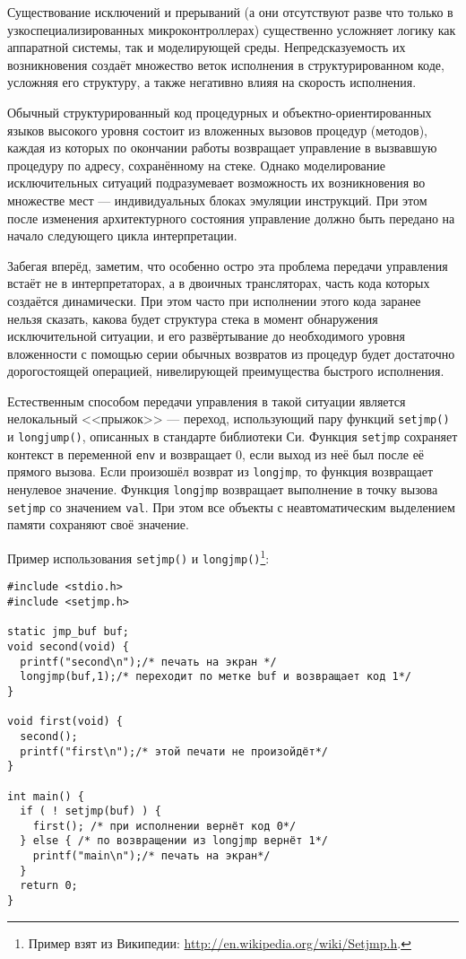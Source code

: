 Существование исключений и прерываний (а они отсутствуют разве что только в узкоспециализированных микроконтроллерах) существенно усложняет логику как аппаратной системы, так и моделирующей среды. Непредсказуемость их возникновения создаёт множество веток исполнения в структурированном коде, усложняя его структуру, а также негативно влияя на скорость исполнения.

Обычный структурированный код про\-це\-дур\-ных и объек\-тно-ори\-ен\-ти\-ро\-ван\-ных языков высокого уровня состоит из вложенных вызовов процедур (методов), каждая из которых по окончании работы возвращает управление в вызвавшую процедуру по адресу, сохранённому на стеке. Однако  моделирование исключительных ситуаций подразумевает возможность их возникновения во множестве мест --- индивидуальных блоках эмуляции инструкций. При этом после изменения архитектурного состояния управление должно быть передано на начало следующего цикла интерпретации.

Забегая вперёд, заметим, что особенно остро эта проблема передачи управления встаёт не в интерпретаторах, а в двоичных трансляторах, часть кода которых создаётся динамически. При этом часто при исполнении этого кода заранее нельзя сказать, какова будет структура стека в момент обнаружения исключительной ситуации, и его развёртывание до необходимого уровня вложенности с помощью серии обычных возвратов из процедур будет достаточно дорогостоящей операцией, нивелирующей преимущества быстрого исполнения.

Естественным способом передачи управления в такой ситуации является нелокальный <<прыжок>> --- переход, использующий пару функций \texttt{setjmp()} и \texttt{longjump()}, описанных в стандарте библиотеки Си. Функция \texttt{setjmp} сохраняет контекст в переменной \texttt{env} и возвращает 0, если выход из неё был после её прямого вызова. Если произошёл возврат из \texttt{longjmp}, то функция возвращает ненулевое значение.
Функция \texttt{longjmp} возвращает выполнение в точку вызова \texttt{setjmp} со значением \texttt{val}. При этом все объекты с неавтоматическим выделением памяти сохраняют своё значение.

Пример использования \texttt{setjmp()} и \texttt{longjmp()}\footnote{Пример взят из Википедии: \url{http://en.wikipedia.org/wiki/Setjmp.h}.}:

\begin{lstlisting}
#include <stdio.h>
#include <setjmp.h>
 
static jmp_buf buf;
void second(void) {
  printf("second\n");/* печать на экран */
  longjmp(buf,1);/* переходит по метке buf и возвращает код 1*/
}
 
void first(void) {
  second();
  printf("first\n");/* этой печати не произойдёт*/
}
 
int main() {   
  if ( ! setjmp(buf) ) {
    first(); /* при исполнении вернёт код 0*/
  } else { /* по возвращении из longjmp вернёт 1*/
    printf("main\n");/* печать на экран*/
  }
  return 0;
}
\end{lstlisting}

